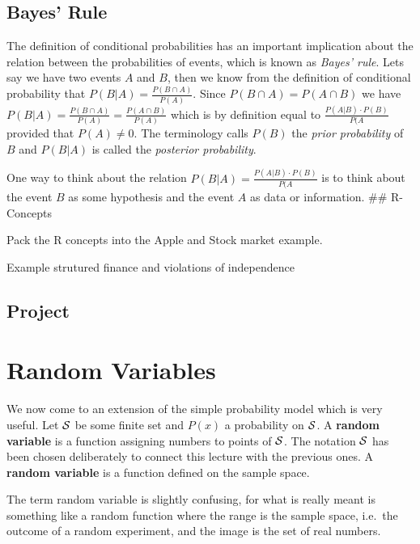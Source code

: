 \documentclass[
]{book}
\begin{document}
\hypertarget{bayes-rule}{%
\section{Bayes' Rule}\label{bayes-rule}}

The definition of conditional probabilities has an important implication about the relation
between the probabilities of events, which is known as \emph{Bayes' rule}. Lets say we have two
events \(A\) and \(B\), then we know from the definition of conditional probability that
\(P(B|A) = \frac{P(B \cap A)}{P(A)}\). Since \(P(B \cap A) = P(A \cap B)\) we have
\(P(B|A) = \frac{P(B \cap A)}{P(A)} = \frac{P(A \cap B)}{P(A)}\) which is by definition
equal to \(\frac{P(A|B) \cdot P(B)}{P(A}\) provided that \(P(A) \neq 0\). The terminology
calls \(P(B)\) the \emph{prior probability} of \(B\) and \(P(B|A)\) is called the \emph{posterior probability}.

One way to think about the relation
\(P(B|A) = \frac{P(A|B) \cdot P(B)}{P(A}\) is to think about the event \(B\) as some hypothesis and
the event \(A\) as data or information.
\#\# R-Concepts

Pack the R concepts into the Apple and Stock market example.

Example strutured finance and violations of independence

\hypertarget{project}{%
\section{Project}\label{project}}

\hypertarget{random-variables}{%
\chapter{Random Variables}\label{random-variables}}

We now come to an extension of the simple probability model which is very useful. Let \({\cal S}\)
be some finite set and \(P(x)\) a probability on \({\cal S}\). A \textbf{random variable} is a
function assigning numbers to points of \({\cal S}\).
The notation \({\cal S}\) has been chosen deliberately to connect this lecture with the previous ones. A \textbf{random variable} is a function defined on the sample space.

The term random variable is slightly confusing, for what is really meant is something like a random function where the range is the sample space, i.e.~the outcome of a random experiment, and
the image is the set of real numbers.
\end{document}

